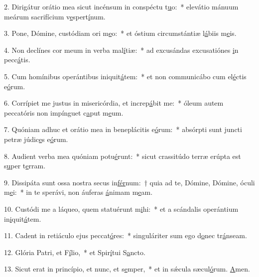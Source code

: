 2. Dirigátur orátio mea sicut incénsum in conspéctu t\uline{u}o:~* elevátio mánuum meárum sacrifícium v\uline{e}spert\uline{í}num.\par 
3. Pone, Dómine, custódiam ori m\uline{e}o:~* et óstium circumstántiæ l\uline{á}biis m\uline{e}is.\par 
4. Non declínes cor meum in verba mal\uline{í}tiæ:~* ad excusándas excusatiónes \uline{i}n pecc\uline{á}tis.\par 
5. Cum homínibus operántibus iniquit\uline{á}tem:~* et non communicábo cum el\uline{é}ctis e\uline{ó}rum.\par 
6. Corrípiet me justus in misericórdia, et increp\uline{á}bit me:~* óleum autem peccatóris non impínguet c\uline{a}put m\uline{e}um.\par 
7. Quóniam adhuc et orátio mea in beneplácitis e\uline{ó}rum:~* absórpti sunt juncti petræ júdic\uline{e}s e\uline{ó}rum.\par 
8. Audient verba mea quóniam potu\uline{é}runt:~* sicut crassitúdo terræ erúpta est s\uline{u}per t\uline{e}rram.\par 
9. Dissipáta sunt ossa nostra secus in\uline{fér}num:~† quia ad te, Dómine, Dómine, óculi m\uline{e}i:~* in te sperávi, non áuferas \uline{á}nimam m\uline{e}am.\par 
10. Custódi me a láqueo, quem statuérunt m\uline{i}hi:~* et a scándalis operántium in\uline{i}quit\uline{á}tem.\par 
11. Cadent in retiáculo ejus peccat\uline{ó}res:~* singuláriter sum ego d\uline{o}nec tr\uline{á}nseam.\par 
12. Glória Patri, et F\uline{í}lio,~* et Spir\uline{í}tui S\uline{a}ncto.\par 
13. Sicut erat in princípio, et nunc, et s\uline{e}mper,~* et in sǽcula sæcul\uline{ó}rum. \uline{A}men.\par 
